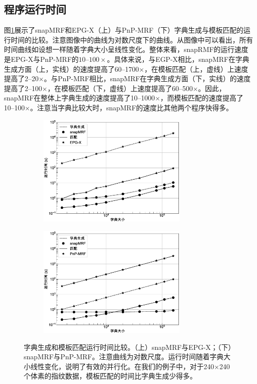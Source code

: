 \subsection{程序运行时间}
图\ref{fig:time}展示了snapMRF和EPG-X（上）与PnP-MRF（下）字典生成与模板匹配的运行时间的比较。注意图像中的曲线为对数尺度下的曲线。从图像中可以看出，所有时间曲线如设想一样随着字典大小呈线性变化。整体来看，snapRMF的运行速度是EPG-X与PnP-MRF的$10$--$100 \times$。具体来说，与EGP-X相比，snapMRF在字典生成方面（上，实线）的速度提高了60--1700$\times$，在模板匹配（上，虚线）上速度提高了2--20$\times$。与PnP-MRF相比，snapMRF在字典生成方面（下，实线）的速度提高了2--100$\times$，在模板匹配（下，虚线）上速度提高了60--500$\times$。因此，snapMRF在整体上字典生成的速度提高了10--1000$\times$，而模板匹配的速度提高了10--100$\times$。注意当字典比较大时，snapMRF的速度比其他两个程序快得多。

\begin{figure}
\centering
\begin{subfigure}
 \centering
 \includegraphics[width=0.8\textwidth]{img/snapmrf/time_vs_epgx.eps}
\end{subfigure}
\begin{subfigure}
 \centering
 \includegraphics[width=0.8\textwidth]{img/snapmrf/time_vs_pnp.eps}
\end{subfigure}
\caption{字典生成和模板匹配运行时间比较。（上）snapMRF与EPG-X；（下）snapMRF与PnP-MRF。注意曲线为对数尺度。运行时间随着字典大小线性变化，说明了有效的并行化。在我们的例子中，对于240$\times$240个体素的指纹数据，模板匹配的时间比字典生成少得多。}
\label{fig:time}
\end{figure}

